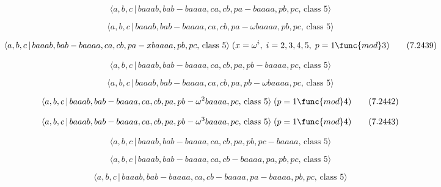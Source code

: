 \documentclass[10pt]{article}
\begin{document}
\begin{equation}
\langle a,b,c\,|\,baaab,bab-baaaa,ca,cb,pa-baaaa,pb,pc,\,\text{class }%
5\rangle  \tag{7.2437}
\end{equation}

\begin{equation}
\langle a,b,c\,|\,baaab,bab-baaaa,ca,cb,pa-\omega baaaa,pb,pc,\,\text{class }%
5\rangle  \tag{7.2438}
\end{equation}

\begin{equation}
\langle a,b,c\,|\,baaab,bab-baaaa,ca,cb,pa-xbaaaa,pb,pc,\,\text{class }%
5\rangle \;(x=\omega ^{i},\;i=2,3,4,5,\;p=1\func{mod}3)  \tag{7.2439}
\end{equation}

\begin{equation}
\langle a,b,c\,|\,baaab,bab-baaaa,ca,cb,pa,pb-baaaa,pc,\,\text{class }%
5\rangle  \tag{7.2440}
\end{equation}

\begin{equation}
\langle a,b,c\,|\,baaab,bab-baaaa,ca,cb,pa,pb-\omega baaaa,pc,\,\text{class }%
5\rangle  \tag{7.2441}
\end{equation}

\begin{equation}
\langle a,b,c\,|\,baaab,bab-baaaa,ca,cb,pa,pb-\omega ^{2}baaaa,pc,\,\text{%
class }5\rangle \;(p=1\func{mod}4)  \tag{7.2442}
\end{equation}

\begin{equation}
\langle a,b,c\,|\,baaab,bab-baaaa,ca,cb,pa,pb-\omega ^{3}baaaa,pc,\,\text{%
class }5\rangle \;(p=1\func{mod}4)  \tag{7.2443}
\end{equation}

\begin{equation}
\langle a,b,c\,|\,baaab,bab-baaaa,ca,cb,pa,pb,pc-baaaa,\,\text{class }%
5\rangle  \tag{7.2444}
\end{equation}

\begin{equation}
\langle a,b,c\,|\,baaab,bab-baaaa,ca,cb-baaaa,pa,pb,pc,\,\text{class }%
5\rangle  \tag{7.2445}
\end{equation}

\begin{equation}
\langle a,b,c\,|\,baaab,bab-baaaa,ca,cb-baaaa,pa-baaaa,pb,pc,\,\text{class }%
5\rangle  \tag{7.2446}
\end{equation}
\end{document}

